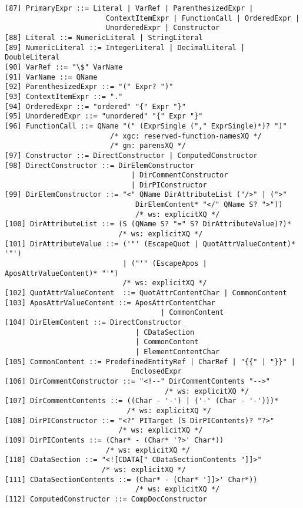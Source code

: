 \begin{Verbatim}[frame=none, fontsize=\footnotesize]
[87] PrimaryExpr ::= Literal | VarRef | ParenthesizedExpr |
                        ContextItemExpr | FunctionCall | OrderedExpr |
                        UnorderedExpr | Constructor 
[88] Literal ::= NumericLiteral | StringLiteral
[89] NumericLiteral ::= IntegerLiteral | DecimalLiteral | DoubleLiteral
[90] VarRef ::= "\$" VarName
[91] VarName ::= QName
[92] ParenthesizedExpr ::= "(" Expr? ")"
[93] ContextItemExpr ::= "."
[94] OrderedExpr ::= "ordered" "{" Expr "}"
[95] UnorderedExpr ::= "unordered" "{" Expr "}"
[96] FunctionCall ::= QName "(" (ExprSingle ("," ExprSingle)*)? ")" 
                         /* xgc: reserved-function-namesXQ */
                         /* gn: parensXQ */
[97] Constructor ::= DirectConstructor | ComputedConstructor
[98] DirectConstructor ::= DirElemConstructor
                              | DirCommentConstructor
                              | DirPIConstructor
[99] DirElemConstructor ::= "<" QName DirAttributeList ("/>" | (">"
                               DirElemContent* "</" QName S? ">"))	
                               /* ws: explicitXQ */
[100] DirAttributeList ::= (S (QName S? "=" S? DirAttributeValue)?)*	
                           /* ws: explicitXQ */
[101] DirAttributeValue ::= ('"' (EscapeQuot | QuotAttrValueContent)* '"')
                            | ("'" (EscapeApos | AposAttrValueContent)* "'")	
                            /* ws: explicitXQ */ 
[102] QuotAttrValueContent	::= QuotAttrContentChar | CommonContent
[103] AposAttrValueContent ::= AposAttrContentChar
                                     | CommonContent
[104] DirElemContent ::= DirectConstructor
                               | CDataSection
                               | CommonContent
                               | ElementContentChar
[105] CommonContent ::= PredefinedEntityRef | CharRef | "{{" | "}}" |
                              EnclosedExpr
[106] DirCommentConstructor ::= "<!--" DirCommentContents "-->"
                                      /* ws: explicitXQ */
[107] DirCommentContents ::= ((Char - '-') | ('-' (Char - '-')))*	
                             /* ws: explicitXQ */
[108] DirPIConstructor ::= "<?" PITarget (S DirPIContents)? "?>"	
                           /* ws: explicitXQ */
[109] DirPIContents ::= (Char* - (Char* '?>' Char*))	
                        /* ws: explicitXQ */
[110] CDataSection ::= "<![CDATA[" CDataSectionContents "]]>"
                       /* ws: explicitXQ */
[111] CDataSectionContents ::= (Char* - (Char* ']]>' Char*))	
                               /* ws: explicitXQ */ 
[112] ComputedConstructor ::= CompDocConstructor

\end{Verbatim}
